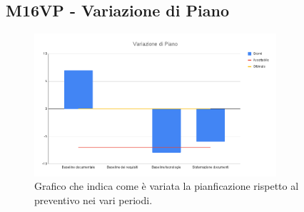 \subsection{M16VP - Variazione di Piano}
\begin{figure}[H]
    \centering\includegraphics[width=0.8\textwidth, height=0.8\textheight,keepaspectratio]{images/Variazione-di-Piano.png}
    \caption{Grafico che indica come è variata la pianficazione rispetto al preventivo nei vari periodi.}
\end{figure}  